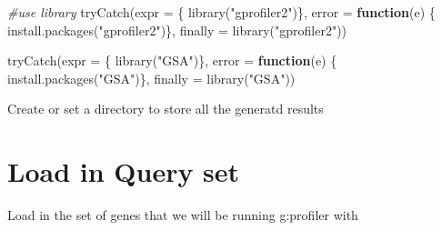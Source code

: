 \documentclass[
]{book}
\newenvironment{Shaded}{\begin{snugshade}}{\end{snugshade}}
\newcommand{\AttributeTok}[1]{\textcolor[rgb]{0.77,0.63,0.00}{#1}}
\newcommand{\CommentTok}[1]{\textcolor[rgb]{0.56,0.35,0.01}{\textit{#1}}}
\newcommand{\ConstantTok}[1]{\textcolor[rgb]{0.00,0.00,0.00}{#1}}
\newcommand{\ControlFlowTok}[1]{\textcolor[rgb]{0.13,0.29,0.53}{\textbf{#1}}}
\newcommand{\FunctionTok}[1]{\textcolor[rgb]{0.00,0.00,0.00}{#1}}
\newcommand{\NormalTok}[1]{#1}
\newcommand{\OtherTok}[1]{\textcolor[rgb]{0.56,0.35,0.01}{#1}}
\newcommand{\SpecialCharTok}[1]{\textcolor[rgb]{0.00,0.00,0.00}{#1}}
\newcommand{\StringTok}[1]{\textcolor[rgb]{0.31,0.60,0.02}{#1}}
\begin{document}
\begin{Shaded}
\begin{Highlighting}[]
\CommentTok{\#use library}
\FunctionTok{tryCatch}\NormalTok{(}\AttributeTok{expr =}\NormalTok{ \{ }\FunctionTok{library}\NormalTok{(}\StringTok{"gprofiler2"}\NormalTok{)\}, }
         \AttributeTok{error =} \ControlFlowTok{function}\NormalTok{(e) \{ }
           \FunctionTok{install.packages}\NormalTok{(}\StringTok{"gprofiler2"}\NormalTok{)\}, }
         \AttributeTok{finally =} \FunctionTok{library}\NormalTok{(}\StringTok{"gprofiler2"}\NormalTok{))}

\FunctionTok{tryCatch}\NormalTok{(}\AttributeTok{expr =}\NormalTok{ \{ }\FunctionTok{library}\NormalTok{(}\StringTok{"GSA"}\NormalTok{)\}, }
         \AttributeTok{error =} \ControlFlowTok{function}\NormalTok{(e) \{ }
           \FunctionTok{install.packages}\NormalTok{(}\StringTok{"GSA"}\NormalTok{)\}, }
         \AttributeTok{finally =} \FunctionTok{library}\NormalTok{(}\StringTok{"GSA"}\NormalTok{))}
\end{Highlighting}
\end{Shaded}

Create or set a directory to store all the generatd results

\begin{Shaded}
\end{Shaded}

\hypertarget{load-in-query-set}{%
\section{Load in Query set}\label{load-in-query-set}}

Load in the set of genes that we will be running g:profiler with

\begin{Shaded}
\end{Shaded}
\end{document}
